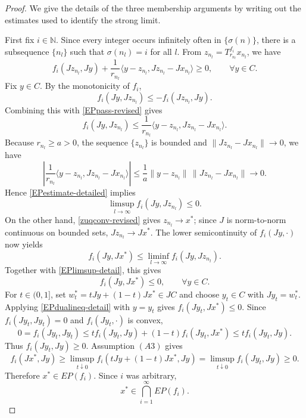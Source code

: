 \documentclass[10pt,a4paper]{amsart}
\numberwithin{equation}{section}
\begin{document}
\begin{proof}
We give the details of the three membership arguments by writing out the estimates used to identify the strong limit.

First fix $i\in\mathbb N$. Since every integer occurs infinitely often in $\{\sigma(n)\}$, there is a subsequence $\{n_l\}$ such that $\sigma(n_l)=i$ for all $l$. From
$z_{n_l}=T_{r_{n_l}}^{f_i}x_{n_l}$, we have
\begin{equation}\label{EPpass-revised}
f_i(Jz_{n_l},Jy)+\frac{1}{r_{n_l}}\langle y-z_{n_l},Jz_{n_l}-Jx_{n_l}\rangle\geq0,
\qquad \forall y\in C.
\end{equation}
Fix $y\in C$. By the monotonicity of $f_i$,
\[
f_i(Jy,Jz_{n_l})\leq -f_i(Jz_{n_l},Jy).
\]
Combining this with \eqref{EPpass-revised} gives
\begin{equation}\label{EPestimate-detailed}
f_i(Jy,Jz_{n_l})\leq
\frac{1}{r_{n_l}}\langle y-z_{n_l},Jz_{n_l}-Jx_{n_l}\rangle.
\end{equation}
Because $r_{n_l}\geq a>0$, the sequence $\{z_{n_l}\}$ is bounded and
$\|Jz_{n_l}-Jx_{n_l}\|\to0$, we have
\[
\left|\frac{1}{r_{n_l}}\langle y-z_{n_l},Jz_{n_l}-Jx_{n_l}\rangle\right|
\leq \frac{1}{a}\|y-z_{n_l}\|\,\|Jz_{n_l}-Jx_{n_l}\|\to0.
\]
Hence \eqref{EPestimate-detailed} implies
\begin{equation}\label{EPlimsup-detail}
\limsup_{l\to\infty} f_i(Jy,Jz_{n_l})\leq0.
\end{equation}
On the other hand, \eqref{zuqconv-revised} gives $z_{n_l}\to x^{*}$; since $J$ is norm-to-norm continuous on bounded sets, $Jz_{n_l}\to Jx^{*}$. The lower semicontinuity of $f_i(Jy,\cdot)$ now yields
\[
f_i(Jy,Jx^{*})\leq \liminf_{l\to\infty} f_i(Jy,Jz_{n_l}).
\]
Together with \eqref{EPlimsup-detail}, this gives
\begin{equation}\label{EPdualineq-detail}
f_i(Jy,Jx^{*})\leq0,
\qquad \forall y\in C.
\end{equation}
For $t\in(0,1]$, set $w_t^{*}=tJy+(1-t)Jx^{*}\in JC$ and choose $y_t\in C$ with $Jy_t=w_t^{*}$. Applying \eqref{EPdualineq-detail} with $y=y_t$ gives $f_i(Jy_t,Jx^{*})\leq0$. Since $f_i(Jy_t,Jy_t)=0$ and $f_i(Jy_t,\cdot)$ is convex,
\[
0=f_i(Jy_t,Jy_t)\leq t f_i(Jy_t,Jy)+(1-t)f_i(Jy_t,Jx^{*})\leq t f_i(Jy_t,Jy).
\]
Thus $f_i(Jy_t,Jy)\geq0$. Assumption $(A3)$ gives
\[
f_i(Jx^{*},Jy)
\geq \limsup_{t\downarrow0} f_i(tJy+(1-t)Jx^{*},Jy)
=\limsup_{t\downarrow0} f_i(Jy_t,Jy)\geq0.
\]
Therefore $x^{*}\in EP(f_i)$. Since $i$ was arbitrary,
\begin{equation}\label{xEP-revised}
x^{*}\in\bigcap_{i=1}^{\infty}EP(f_i).
\end{equation}


\end{proof}
\end{document}
